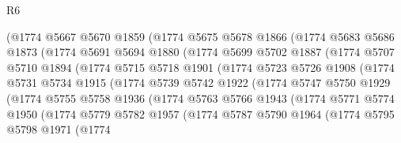 \begin{lexlean}{R6}
\begin{coremodule}
              (@1774
                @5667
                @5670
                @1859
                (@1774
                  @5675
                  @5678
                  @1866
                  (@1774
                    @5683
                    @5686
                    @1873
                    (@1774
                      @5691
                      @5694
                      @1880
                      (@1774
                        @5699
                        @5702
                        @1887
                        (@1774
                          @5707
                          @5710
                          @1894
                          (@1774
                            @5715
                            @5718
                            @1901
                            (@1774
                              @5723
                              @5726
                              @1908
                              (@1774
                                @5731
                                @5734
                                @1915
                                (@1774
                                  @5739
                                  @5742
                                  @1922
                                  (@1774
                                    @5747
                                    @5750
                                    @1929
                                    (@1774
                                      @5755
                                      @5758
                                      @1936
                                      (@1774
                                        @5763
                                        @5766
                                        @1943
                                        (@1774
                                          @5771
                                          @5774
                                          @1950
                                          (@1774
                                            @5779
                                            @5782
                                            @1957
                                            (@1774
                                              @5787
                                              @5790
                                              @1964
                                              (@1774
                                                @5795
                                                @5798
                                                @1971
                                                (@1774

\end{coremodule}
\end{lexlean}
